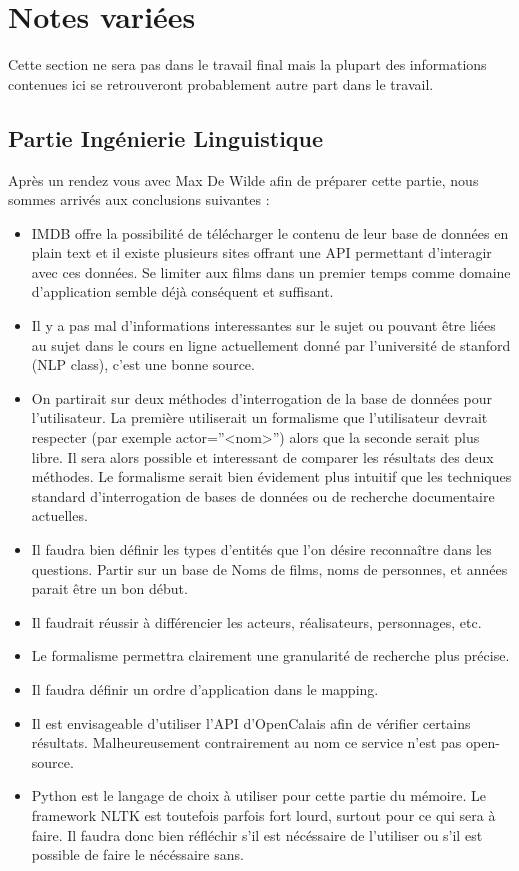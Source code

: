 \documentclass[11pt]{article}
\begin{document}
\section{Notes variées}
Cette section ne sera pas dans le travail final mais la plupart des informations contenues ici se retrouveront probablement autre part dans le travail.
\subsection{Partie Ingénierie Linguistique}
Après un rendez vous avec Max De Wilde afin de préparer cette partie, nous sommes arrivés aux conclusions suivantes :
\begin{itemize}
  \item IMDB offre la possibilité de télécharger le contenu de leur base de données en plain text et il existe plusieurs sites offrant une API permettant d'interagir avec ces données. Se limiter aux films dans un premier temps comme domaine d'application semble déjà conséquent et suffisant.
  \item Il y a pas mal d'informations interessantes sur le sujet ou pouvant être liées au sujet dans le cours en ligne actuellement donné par l'université de stanford (NLP class), c'est une bonne source.
  \item On partirait sur deux méthodes d'interrogation de la base de données pour l'utilisateur. La première utiliserait un formalisme que l'utilisateur devrait respecter (par exemple actor=''<nom>'') alors que la seconde serait plus libre. Il sera alors possible et interessant de comparer les résultats des deux méthodes. Le formalisme serait bien évidement plus intuitif que les techniques standard d'interrogation de bases de données ou de recherche documentaire actuelles.
  \item Il faudra bien définir les types d'entités que l'on désire reconnaître dans les questions. Partir sur un base de Noms de films, noms de personnes, et années parait être un bon début.
  \item Il faudrait réussir à différencier les acteurs, réalisateurs, personnages, etc.
  \item Le formalisme permettra clairement une granularité de recherche plus précise.
  \item Il faudra définir un ordre d'application dans le mapping.
  \item Il est envisageable d'utiliser l'API d'OpenCalais afin de vérifier certains résultats. Malheureusement contrairement au nom ce service n'est pas open-source.
  \item Python est le langage de choix à utiliser pour cette partie du mémoire. Le framework NLTK est toutefois parfois fort lourd, surtout pour ce qui sera à faire. Il faudra donc bien réfléchir s'il est nécéssaire de l'utiliser ou s'il est possible de faire le nécéssaire sans.
\end{itemize}
\end{document}
